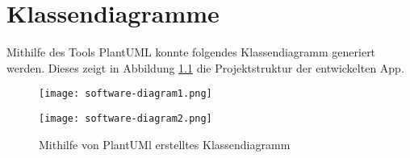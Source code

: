 
\chapter{Klassendiagramme}

Mithilfe des Tools PlantUML konnte folgendes Klassendiagramm generiert werden. Dieses zeigt in Abbildung \ref{fig:softwarediagram} die Projektstruktur der entwickelten App.

\begin{figure}[H]
    \centering
    \texttt{[image: software-diagram1.png]}
\end{figure}

\begin{figure}[H]
    \centering
    \texttt{[image: software-diagram2.png]}
    \label{fig:softwarediagram}
    \caption{Mithilfe von PlantUMl erstelltes Klassendiagramm}
\end{figure}